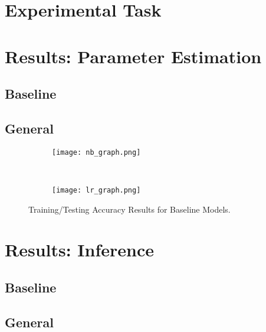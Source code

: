 \documentclass{article}
\begin{document}



\section{Experimental Task}
\label{sec:task}



\section{Results: Parameter Estimation}
\label{sec:results-param}
\subsection{Baseline}
\subsection{General}


\begin{figure}
  \centering
  \begin{subfigure}[b]{0.47\textwidth}
    \centering
    \texttt{[image: nb\_graph.png]}
    \caption*{}
    \label{fig:nb_graph}
  \end{subfigure}
  ~
  \begin{subfigure}[b]{0.47\textwidth}
    \centering
    \texttt{[image: lr\_graph.png]}
    \caption*{}
    \label{fig:lr_graph}
  \end{subfigure}
  \vspace{-10pt}
  \caption{Training/Testing Accuracy Results for Baseline Models.}
\end{figure}

\section{Results: Inference}
\label{sec:results-inference}
\subsection{Baseline}
\subsection{General}
\end{document}
